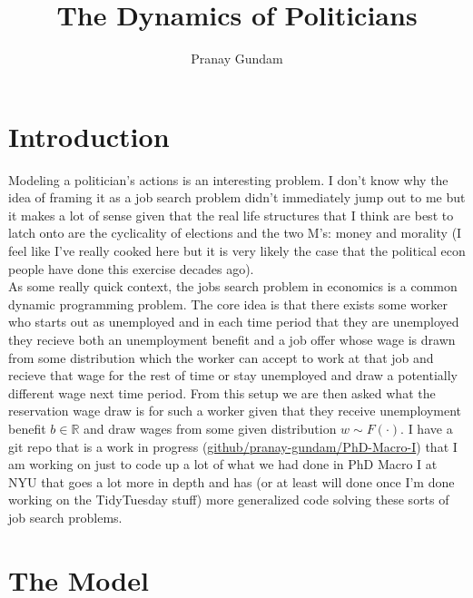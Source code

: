 \documentclass[11pt,english]{article}
\title{\textbf{The Dynamics of Politicians}}
\author{Pranay Gundam}
\begin{document}
\maketitle


\section*{Introduction}

Modeling a politician's actions is an interesting problem. I don't know why the idea of framing it as a job search problem didn't immediately jump out to me but it makes a lot of sense given that the real life structures that I think are best to latch onto are the cyclicality of elections and the two M's: money and morality (I feel like I've really cooked here but it is very likely the case that the political econ people have done this exercise decades ago). \\

\noindent As some really quick context, the jobs search problem in economics is a common dynamic programming problem. The core idea is that there exists some worker who starts out as unemployed and in each time period that they are unemployed they recieve both an unemployment benefit and a job offer whose wage is drawn from some distribution which the worker can accept to work at that job and recieve that wage for the rest of time or stay unemployed and draw a potentially different wage next time period. From this setup we are then asked what the reservation wage draw is for such a worker given that they receive unemployment benefit $b\in \mathbb{R}$ and draw wages from some given distribution $w \sim F(\cdot)$. I have a git repo that is a work in progress (\href{https://github.com/pranay-gundam/PhDMacro-I}{github/pranay-gundam/PhD-Macro-I}) that I am working on just to code up a lot of what we had done in PhD Macro I at NYU that goes a lot more in depth and has (or at least will done once I'm done working on the TidyTuesday stuff) more generalized code solving these sorts of job search problems.

\section*{The Model}
\end{document}
